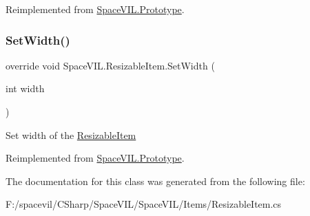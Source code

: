 Reimplemented from \mbox{\hyperlink{class_space_v_i_l_1_1_prototype_adc0adcbd1c3800d9525798ba7be5832a}{Space\+V\+I\+L.\+Prototype}}.

\mbox{\label{class_space_v_i_l_1_1_resizable_item_a7f12553e7547d5ef653be8719e9cfee4}} 
\subsubsection{\texorpdfstring{Set\+Width()}{SetWidth()}}
{\footnotesize\ttfamily override void Space\+V\+I\+L.\+Resizable\+Item.\+Set\+Width (\begin{DoxyParamCaption}\item[{int}]{width }\end{DoxyParamCaption})\hspace{0.3cm}{\ttfamily [virtual]}}



Set width of the \mbox{\hyperlink{class_space_v_i_l_1_1_resizable_item}{Resizable\+Item}} 



Reimplemented from \mbox{\hyperlink{class_space_v_i_l_1_1_prototype_a6a4f1b9581f4d18f1c3a3e287d4b2a2b}{Space\+V\+I\+L.\+Prototype}}.



The documentation for this class was generated from the following file\+:\begin{DoxyCompactItemize}
\item 
F\+:/spacevil/\+C\+Sharp/\+Space\+V\+I\+L/\+Space\+V\+I\+L/\+Items/Resizable\+Item.\+cs\end{DoxyCompactItemize}
